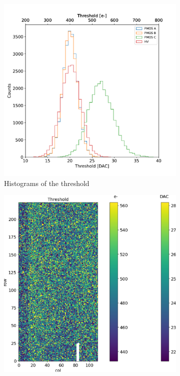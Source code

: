         \begin{figure}
            \centering
            \begin{subfigure}[b]{0.49\textwidth}
                \centering
                \includegraphics[width=\linewidth]{figures/charaterization/threshold_histogram.pdf}                
                \caption{Histograms of the threshold}
                \label{fig:threhsold_hist}
            \end{subfigure}
            \hfill
            \begin{subfigure}[b]{0.49\textwidth}
                \centering
                \includegraphics[width=\linewidth]{figures/charaterization/threshold_map.pdf}                

\end{subfigure}
\end{figure}
